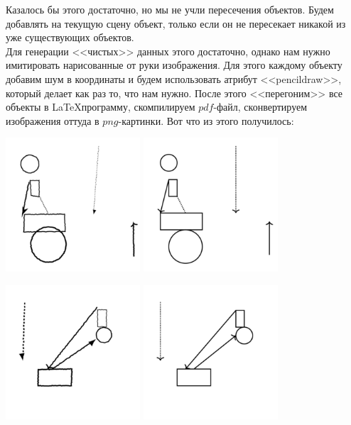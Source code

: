 \documentclass{article}
\begin{document}
Казалось бы этого достаточно, но мы не учли пересечения объектов. Будем добавлять на текущую сцену объект, только если он не пересекает никакой из уже существующих объектов.\\
Для генерации <<чистых>> данных этого достаточно, однако нам нужно имитировать нарисованные от руки изображения. Для этого каждому объекту добавим шум в координаты и будем использовать атрибут <<pencildraw>>, который делает как раз то, что нам нужно. После этого <<перегоним>> все объекты в \LaTeX программу, скомпилируем $pdf$-файл, сконвертируем изображения оттуда в $png$-картинки. Вот что из этого получилось:
\begin{center}
    \includegraphics[width=50mm]{Images/2.png}
    \qquad \qquad
    \includegraphics[width=50mm]{Images/2_orig.png}
\end{center}
\begin{center}
    \includegraphics[width=50mm]{Images/3.png}
    \qquad
    \includegraphics[width=50mm]{Images/3_orig.png}
\end{center}
\end{document}

